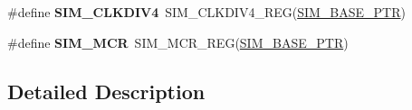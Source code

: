 \begin{DoxyCompactItemize}
\item 
\hypertarget{group___s_i_m___register___accessor___macros_gaf1e44731f9be570d976fcf9a288b7fbd}{}\#define {\bfseries S\+I\+M\+\_\+\+C\+L\+K\+D\+I\+V4}~S\+I\+M\+\_\+\+C\+L\+K\+D\+I\+V4\+\_\+\+R\+E\+G(\hyperlink{group___s_i_m___peripheral_ga719ec5df95fbb5732438f794f2cccf3c}{S\+I\+M\+\_\+\+B\+A\+S\+E\+\_\+\+P\+T\+R})\label{group___s_i_m___register___accessor___macros_gaf1e44731f9be570d976fcf9a288b7fbd}

\item 
\hypertarget{group___s_i_m___register___accessor___macros_ga841173a4c180c962c292f6602b30472b}{}\#define {\bfseries S\+I\+M\+\_\+\+M\+C\+R}~S\+I\+M\+\_\+\+M\+C\+R\+\_\+\+R\+E\+G(\hyperlink{group___s_i_m___peripheral_ga719ec5df95fbb5732438f794f2cccf3c}{S\+I\+M\+\_\+\+B\+A\+S\+E\+\_\+\+P\+T\+R})\label{group___s_i_m___register___accessor___macros_ga841173a4c180c962c292f6602b30472b}

\end{DoxyCompactItemize}


\subsection{Detailed Description}
